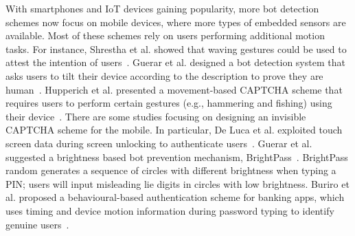 With smartphones and IoT devices gaining popularity, more bot detection schemes now focus on mobile devices, where more types of embedded sensors are available. Most of these schemes rely on users performing additional motion tasks. For instance, Shrestha et al. showed that waving gestures could be used to attest the intention of users~\cite{10.1007/978-3-319-02937-5_11}. Guerar et al. designed a bot detection system that asks users to tilt their device according to the description to prove they are human~\cite{guerar2018completely}. Hupperich et al. presented a movement-based CAPTCHA scheme that requires users to perform certain gestures (e.g., hammering and fishing) using their device~\cite{10.1007/978-3-319-45572-3_3}. There are some studies focusing on designing an invisible CAPTCHA scheme for the mobile. In particular, De Luca et al. exploited touch screen data during screen unlocking to authenticate users~\cite{DeLuca:2012:TMO:2207676.2208544}. Guerar et al. suggested a brightness based bot prevention mechanism, BrightPass~\cite{guerar2016using}. BrightPass random generates a sequence of circles with different brightness when typing a PIN; users will input misleading lie digits in circles with low brightness. Buriro et al. proposed a behavioural-based authentication scheme for banking apps, which uses timing and device motion information during password typing to identify genuine users~\cite{buriro2017evaluation}. 